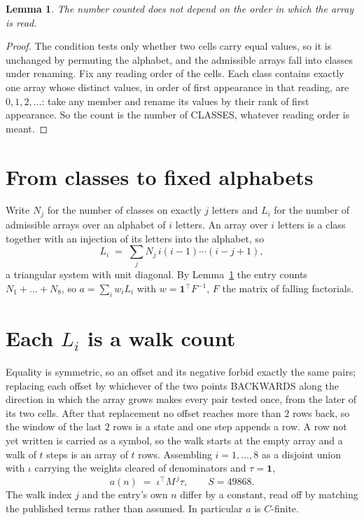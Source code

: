 \documentclass[11pt,a4paper]{article}
\theoremstyle{plain}
\newtheorem{lemma}[theorem]{Lemma}
\theoremstyle{definition}
\begin{document}
\begin{lemma}\label{lem:order}
The number counted does not depend on the order in which the array is read.
\end{lemma}

\begin{proof}
The condition tests only whether two cells carry equal values, so it is unchanged by permuting
the alphabet, and the admissible arrays fall into classes under renaming. Fix any reading order
of the cells. Each class contains exactly one array whose distinct values, in order of first
appearance in that reading, are $0,1,2,\dots$: take any member and rename its values by their
rank of first appearance. So the count is the number of CLASSES, whatever reading order is
meant.
\end{proof}

\section{From classes to fixed alphabets}

Write $N_j$ for the number of classes on exactly $j$ letters and $L_i$ for the number of
admissible arrays over an alphabet of $i$ letters. An array over $i$ letters is a class together
with an injection of its letters into the alphabet, so
\[
L_i\;=\;\sum_j N_j\,i(i-1)\cdots(i-j+1),
\]
a triangular system with unit diagonal. By Lemma~\ref{lem:order} the entry counts
$N_1+\dots+N_{8}$, so $a=\sum_i w_iL_i$ with $w=\mathbf{1}^{\!\top}F^{-1}$, $F$ the
matrix of falling factorials.

\section{Each $L_i$ is a walk count}

Equality is symmetric, so an offset and its negative forbid exactly the same pairs; replacing
each offset by whichever of the two points BACKWARDS along the direction in which the array
grows makes every pair tested once, from the later of its two cells. After that replacement no
offset reaches more than $2$ rows back, so the window of the last $2$
rows is a state and one step appends a row. A row not yet written is
carried as a symbol, so the walk starts at the empty array and a walk of $t$ steps is an array
of $t$ rows. Assembling $i=1,\dots,8$ as a disjoint union with $\iota$ carrying the
weights cleared of denominators and $\tau=\mathbf{1}$,
\[
a(n)\;=\;\iota^{\!\top}M^{\,j}\tau ,\qquad S=49868.
\]
The walk index $j$ and the entry's own $n$ differ by a constant, read off by matching the
published terms rather than assumed. In particular $a$ is $C$-finite.
\end{document}
